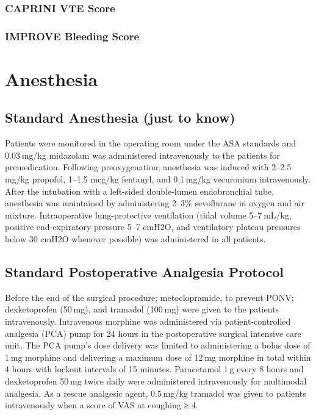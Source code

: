 \documentclass[
  letterpaper,
  DIV=11,
  numbers=noendperiod]{scrreprt}
\begin{document}
\subsubsection{CAPRINI VTE Score}\label{caprini-vte-score}

\subsubsection{IMPROVE Bleeding Score}\label{improve-bleeding-score}

\section{Anesthesia}\label{anesthesia}

\subsection{Standard Anesthesia (just to
know)}\label{standard-anesthesia-just-to-know}

Patients were monitored in the operating room under the ASA standards
and 0.03 mg/kg midazolam was administered intravenously to the patients
for premedication. Following preoxygenation; anesthesia was induced with
2--2.5 mg/kg propofol, 1--1.5 mcg/kg fentanyl, and 0.1 mg/kg vecuronium
intravenously. After the intubation with a left-sided double-lumen
endobronchial tube, anesthesia was maintained by administering 2--3\%
sevoflurane in oxygen and air mixture. Intraoperative lung-protective
ventilation (tidal volume 5--7 mL/kg, positive end-expiratory pressure
5--7 cmH2O, and ventilatory plateau pressures below 30 cmH2O whenever
possible) was administered in all patients.

\subsection{Standard Postoperative Analgesia
Protocol}\label{standard-postoperative-analgesia-protocol}

Before the end of the surgical procedure; metoclopramide, to prevent
PONV; dexketoprofen (50 mg), and tramadol (100 mg) were given to the
patients intravenously. Intravenous morphine was administered via
patient-controlled analgesia (PCA) pump for 24 hours in the
postoperative surgical intensive care unit. The PCA pump's dose delivery
was limited to administering a bolus dose of 1 mg morphine and
delivering a maximum dose of 12 mg morphine in total within 4 hours with
lockout intervals of 15 minutes. Paracetamol 1 g every 8 hours and
dexketoprofen 50 mg twice daily were administered intravenously for
multimodal analgesia. As a rescue analgesic agent, 0.5 mg/kg tramadol
was given to patients intravenously when a score of VAS at coughing ≥ 4.
\end{document}
